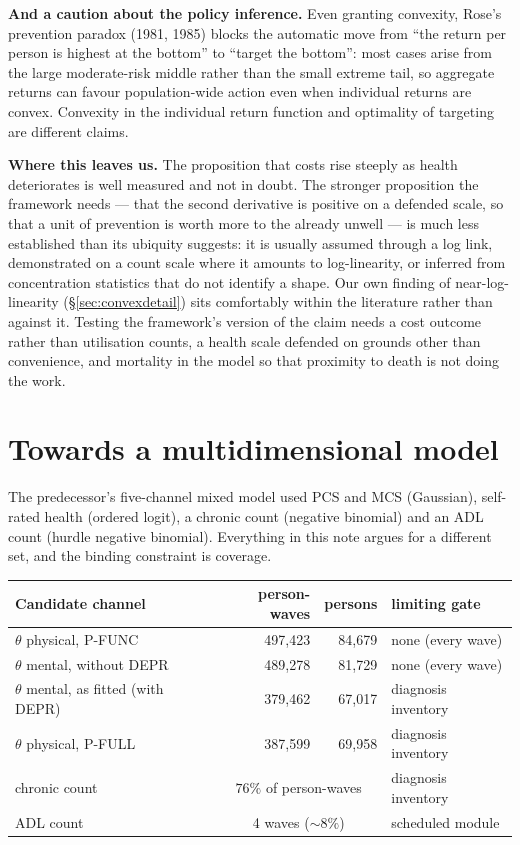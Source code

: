 \documentclass[11pt]{article}
\begin{document}
\textbf{And a caution about the policy inference.} Even granting convexity,
Rose's prevention paradox (1981, 1985) blocks the automatic move from ``the
return per person is highest at the bottom'' to ``target the bottom'': most
cases arise from the large moderate-risk middle rather than the small extreme
tail, so aggregate returns can favour population-wide action even when
individual returns are convex. Convexity in the individual return function
and optimality of targeting are different claims.

\textbf{Where this leaves us.} The proposition that costs rise steeply as
health deteriorates is well measured and not in doubt. The stronger
proposition the framework needs --- that the second derivative is positive on
a defended scale, so that a unit of prevention is worth more to the already
unwell --- is much less established than its ubiquity suggests: it is usually
assumed through a log link, demonstrated on a count scale where it amounts to
log-linearity, or inferred from concentration statistics that do not identify
a shape. Our own finding of near-log-linearity
(\S\ref{sec:convexdetail}) sits comfortably within the literature rather than
against it. Testing the framework's version of the claim needs a cost outcome
rather than utilisation counts, a health scale defended on grounds other than
convenience, and mortality in the model so that proximity to death is not
doing the work.

\section{Towards a multidimensional model}
\label{sec:multidim}

The predecessor's five-channel mixed model used PCS and MCS (Gaussian),
self-rated health (ordered logit), a chronic count (negative binomial) and an
ADL count (hurdle negative binomial). Everything in this note argues for a
different set, and the binding constraint is coverage.

\begin{center}\small
\begin{tabular}{lrrl}
\toprule
Candidate channel & person-waves & persons & limiting gate \\
\midrule
$\theta$ physical, P-FUNC & 497{,}423 & 84{,}679 & none (every wave) \\
$\theta$ mental, without DEPR & 489{,}278 & 81{,}729 & none (every wave) \\
$\theta$ mental, as fitted (with DEPR) & 379{,}462 & 67{,}017 & diagnosis inventory \\
$\theta$ physical, P-FULL & 387{,}599 & 69{,}958 & diagnosis inventory \\
chronic count & \multicolumn{2}{c}{$76\%$ of person-waves} & diagnosis inventory \\
ADL count & \multicolumn{2}{c}{4 waves ($\sim 8\%$)} & scheduled module \\
\bottomrule
\end{tabular}
\end{center}
\end{document}
